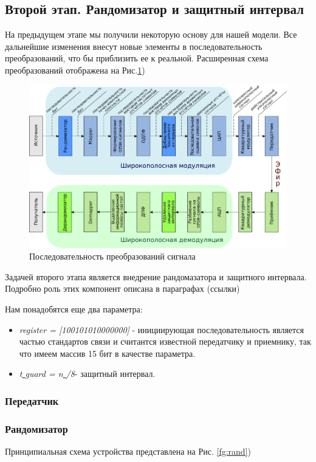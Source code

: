 \subsection{Второй этап. Рандомизатор и защитный интервал}
На предыдущем этапе мы получили некоторую основу для нашей модели.
Все дальнейшие изменения внесут новые элементы в последовательность преобразований, что бы приблизить ее к реальной.
Расширенная схема преобразований отображена на Рис.\ref{fg:OFDM-2}) 
\begin{figure}[h!]
\centering
\includegraphics[width=1\textwidth]{OFDM-2}
\caption{Последовательность преобразований сигнала} \label{fg:OFDM-2}
\end{figure}

Задачей второго этапа является внедрение рандомазатора и защитного интервала. 
 Подробно роль этих компонент описана в параграфах (ссылки)
 
 Нам понадобятся еще два параметра:
 \begin{itemize}
 \item \textit{register = [100101010000000]} -   инициирующая последовательность является частью стандартов связи и считантся известной передатчику и приемнику, так что  имеем массив 15 бит в качестве параметра.
 \item \textit{t\underline{ }guard = n\underline{ }/8}- защитный интервал. 
 \end{itemize}
 
\subsubsection{Передатчик}

\subsubsection*{Рандомизатор}
Принципиальная схема устройства представлена на Рис. \ref{fg:rand}) 


